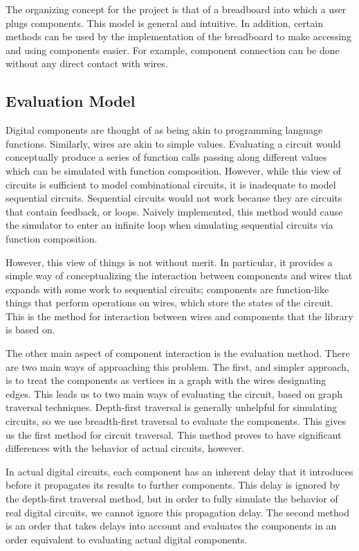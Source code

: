 \documentclass{article}
\begin{document}
The organizing concept for the project is that of a breadboard into which a user plugs components. This model is general and intuitive. In addition, certain methods can be used by the implementation of the breadboard to make accessing and using components easier. For example, component connection can be done without any direct contact with wires.

\subsection{Evaluation Model}

Digital components are thought of as being akin to programming language functions. Similarly, wires are akin to simple values. Evaluating a circuit would conceptually produce a series of function calls passing along different values which can be simulated with function composition. However, while this view of circuits is sufficient to model combinational circuits, it is inadequate to model sequential circuits. Sequential circuits would not work because they are circuits that contain feedback, or loops. Naively implemented, this method would cause the simulator to enter an infinite loop when simulating sequential circuits via function composition.

However, this view of things is not without merit. In particular, it provides a simple way of conceptualizing the interaction between components and wires that expands with some work to sequential circuits; components are function-like things that perform operations on wires, which store the states of the circuit. This is the method for interaction between wires and components that the library is based on.

The other main aspect of component interaction is the evaluation method. There are two main ways of approaching this problem. The first, and simpler approach, is to treat the components as vertices in a graph with the wires designating edges. This leads us to two main ways of evaluating the circuit, based on graph traversal techniques. Depth-first traversal is generally unhelpful for simulating circuits, so we use breadth-first traversal to evaluate the components. This gives us the first method for circuit traversal. This method proves to have significant differences with the behavior of actual circuits, however.

In actual digital circuits, each component has an inherent delay that it introduces before it propagates its results to further components. This delay is ignored by the depth-first traversal method, but in order to fully simulate the behavior of real digital circuits, we cannot ignore this propagation delay. The second method is an order that takes delays into account and evaluates the components in an order equivalent to evaluating actual digital components.
\end{document}
